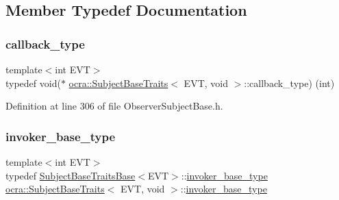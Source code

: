 \subsection{Member Typedef Documentation}
\hypertarget{structocra_1_1SubjectBaseTraits_3_01EVT_00_01void_01_4_a805e01034816edb44ee4269aba6c5beb}{}\label{structocra_1_1SubjectBaseTraits_3_01EVT_00_01void_01_4_a805e01034816edb44ee4269aba6c5beb} 
\subsubsection{\texorpdfstring{callback\+\_\+type}{callback\_type}}
{\footnotesize\ttfamily template$<$int E\+VT$>$ \\
typedef void($\ast$ \hyperlink{structocra_1_1SubjectBaseTraits}{ocra\+::\+Subject\+Base\+Traits}$<$ E\+VT, void $>$\+::callback\+\_\+type) (int)}



Definition at line 306 of file Observer\+Subject\+Base.\+h.

\hypertarget{structocra_1_1SubjectBaseTraits_3_01EVT_00_01void_01_4_a28d0e1b20cde0e239218e2ef724502b1}{}\label{structocra_1_1SubjectBaseTraits_3_01EVT_00_01void_01_4_a28d0e1b20cde0e239218e2ef724502b1} 
\subsubsection{\texorpdfstring{invoker\+\_\+base\+\_\+type}{invoker\_base\_type}}
{\footnotesize\ttfamily template$<$int E\+VT$>$ \\
typedef \hyperlink{structocra_1_1SubjectBaseTraitsBase}{Subject\+Base\+Traits\+Base}$<$E\+VT$>$\+::\hyperlink{structocra_1_1SubjectBaseTraitsBase_a439671662c8f8f3e80e6675f008dec3f}{invoker\+\_\+base\+\_\+type} \hyperlink{structocra_1_1SubjectBaseTraits}{ocra\+::\+Subject\+Base\+Traits}$<$ E\+VT, void $>$\+::\hyperlink{structocra_1_1SubjectBaseTraitsBase_a439671662c8f8f3e80e6675f008dec3f}{invoker\+\_\+base\+\_\+type}}



